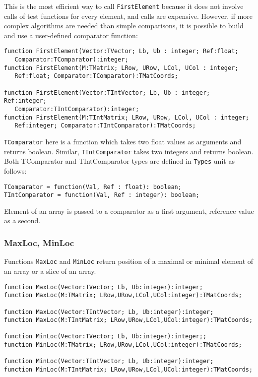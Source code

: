 \documentclass[12pt,a4paper,oneside]{article}
\newcommand{\code}[1]{\texttt{#1}}
\begin{document}
This is the most efficient way to call \code{FirstElement} because it does not involve calls of test functions for every element, and calls are expensive. However, if more complex algorithms are needed than simple comparisons, it is possible to build and use a user-defined comparator function:
\begin{verbatim}
function FirstElement(Vector:TVector; Lb, Ub : integer; Ref:float;
   Comparator:TComparator):integer;
function FirstElement(M:TMatrix; LRow, URow, LCol, UCol : integer;
   Ref:float; Comparator:TComparator):TMatCoords;

function FirstElement(Vector:TIntVector; Lb, Ub : integer; Ref:integer;
   Comparator:TIntComparator):integer;
function FirstElement(M:TIntMatrix; LRow, URow, LCol, UCol : integer;
   Ref:integer; Comparator:TIntComparator):TMatCoords; 
\end{verbatim}

\code{TComparator} here is a function which takes two float values as arguments and returns boolean. Similar, \code{TIntComparator} takes two integers and returns boolean. Both TComparator and TIntComparator types are defined in \code{Types} unit as follows:
\begin{verbatim}
TComparator = function(Val, Ref : float): boolean;
TIntComparator = function(Val, Ref : integer): boolean;
\end{verbatim}
Element of an array is passed to a comparator as a first argument, reference value as a second.
\subsubsection{MaxLoc, MinLoc}
Functions \code{MaxLoc} and \code{MinLoc} return position of a maximal or minimal element of an array or a slice of an array.
\begin{verbatim}
function MaxLoc(Vector:TVector; Lb, Ub:integer):integer;
function MaxLoc(M:TMatrix; LRow,URow,LCol,UCol:integer):TMatCoords;

function MaxLoc(Vector:TIntVector; Lb, Ub:integer):integer;
function MaxLoc(M:TIntMatrix; LRow,URow,LCol,UCol:integer):TMatCoords;

function MinLoc(Vector:TVector; Lb, Ub:integer):integer;;
function MinLoc(M:TMatrix; LRow,URow,LCol,UCol:integer):TMatCoords;

function MinLoc(Vector:TIntVector; Lb, Ub:integer):integer;
function MinLoc(M:TIntMatrix; LRow,URow,LCol,UCol:integer):TMatCoords;
\end{verbatim}
\end{document}
